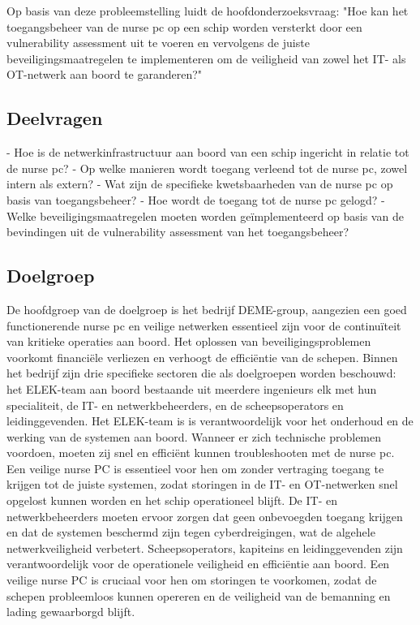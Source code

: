 Op basis van deze probleemstelling luidt de hoofdonderzoeksvraag:
"Hoe kan het toegangsbeheer van de nurse pc op een schip worden versterkt door een vulnerability assessment uit te voeren en vervolgens de juiste beveiligingsmaatregelen te implementeren om de veiligheid van zowel het IT- als OT-netwerk aan boord te garanderen?"

\subsection{Deelvragen}
- Hoe is de netwerkinfrastructuur aan boord van een schip ingericht in relatie tot de nurse pc?
- Op welke manieren wordt toegang verleend tot de nurse pc, zowel intern als extern?
- Wat zijn de specifieke kwetsbaarheden van de nurse pc op basis van toegangsbeheer?
- Hoe wordt de toegang tot de nurse pc gelogd?
- Welke beveiligingsmaatregelen moeten worden geïmplementeerd op basis van de bevindingen uit de vulnerability assessment van het toegangsbeheer?


\subsection{Doelgroep}
De hoofdgroep van de doelgroep is het bedrijf DEME-group, aangezien een goed functionerende nurse pc en veilige netwerken 
essentieel zijn voor de continuïteit van kritieke operaties aan boord. Het oplossen van beveiligingsproblemen voorkomt financiële verliezen en verhoogt de efficiëntie van de schepen.
Binnen het bedrijf zijn drie specifieke sectoren die als doelgroepen worden beschouwd: het ELEK-team aan boord bestaande uit meerdere ingenieurs elk met hun specialiteit, de IT- en netwerkbeheerders, en de scheepsoperators en leidinggevenden.
Het ELEK-team is is verantwoordelijk voor het onderhoud en de werking van de systemen aan boord. Wanneer er zich technische problemen voordoen, moeten zij snel en efficiënt kunnen troubleshooten met de nurse pc.
Een veilige nurse PC is essentieel voor hen om zonder vertraging toegang te krijgen tot de juiste systemen, zodat storingen in de IT- en OT-netwerken snel opgelost kunnen worden en het schip operationeel blijft.
De IT- en netwerkbeheerders moeten ervoor zorgen dat geen onbevoegden toegang krijgen en dat de systemen beschermd zijn tegen cyberdreigingen, wat de algehele netwerkveiligheid verbetert.
Scheepsoperators, kapiteins en leidinggevenden zijn verantwoordelijk voor de operationele veiligheid en efficiëntie aan boord. Een veilige nurse PC is cruciaal voor hen om storingen te voorkomen, zodat de schepen probleemloos kunnen opereren en de 
veiligheid van de bemanning en lading gewaarborgd blijft.


